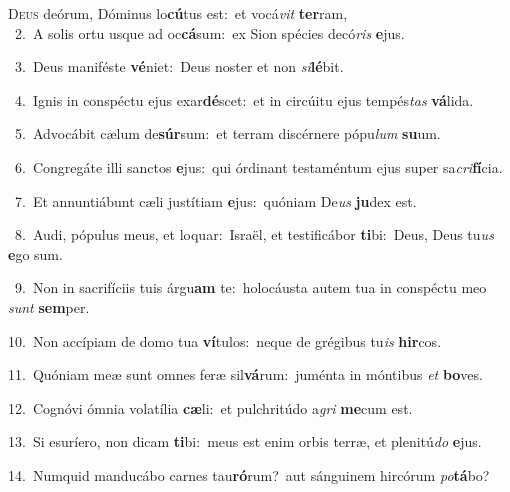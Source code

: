 \lettrine{\initial\textcolor{\initialcolor}{D}}{eus} deórum, Dóminus lo\-\textbf{cú}\-tus est:~\star et vocá\textit{vit} \textbf{ter}\-ram,\\
{\numbfont\textcolor{\numbcolor}{~2.}}~A solis ortu usque ad oc\-\textbf{cá}\-sum:~\star ex Sion spécies decó\textit{ris} \textbf{e}\-jus.\par
{\numbfont\textcolor{\numbcolor}{~3.}}~Deus maniféste \textbf{vé}\-niet:~\star Deus noster et non \textit{si}\-\textbf{lé}bit.\par
{\numbfont\textcolor{\numbcolor}{~4.}}~Ignis in conspéctu ejus exar\-\textbf{dé}\-scet:~\star et in circúitu ejus tempés\textit{tas} \textbf{vá}\-lida.\par
{\numbfont\textcolor{\numbcolor}{~5.}}~Advocábit cælum de\-\textbf{súr}\-sum:~\star et terram discérnere pópu\textit{lum} \textbf{su}\-um.\par
{\numbfont\textcolor{\numbcolor}{~6.}}~Congregáte illi sanctos \textbf{e}\-jus:~\star qui órdinant testaméntum ejus super sa\-\textit{cri}\-\textbf{fí}cia.\par
{\numbfont\textcolor{\numbcolor}{~7.}}~Et annuntiábunt cæli justítiam \textbf{e}\-jus:~\star quóniam De\textit{us} \textbf{ju}\-dex est.\par
{\numbfont\textcolor{\numbcolor}{~8.}}~Audi, pópulus meus, et loquar:~\dagger Israël, et testificábor \textbf{ti}\-bi:~\star Deus, Deus tu\textit{us} \textbf{e}\-go sum.\par
{\numbfont\textcolor{\numbcolor}{~9.}}~Non in sacrifíciis tuis árgu\textbf{am} te:~\star holocáusta autem tua in conspéctu meo \textit{sunt} \textbf{sem}\-per.\par
{\numbfont\textcolor{\numbcolor}{10.}}~Non accípiam de domo tua \textbf{ví}\-tulos:~\star neque de grégibus tu\textit{is} \textbf{hir}\-cos.\par
{\numbfont\textcolor{\numbcolor}{11.}}~Quóniam meæ sunt omnes feræ sil\-\textbf{vá}\-rum:~\star juménta in móntibus \textit{et} \textbf{bo}\-ves.\par
{\numbfont\textcolor{\numbcolor}{12.}}~Cognóvi ómnia volatília \textbf{cæ}\-li:~\star et pulchritúdo a\textit{gri} \textbf{me}\-cum est.\par
{\numbfont\textcolor{\numbcolor}{13.}}~Si esuríero, non dicam \textbf{ti}\-bi:~\star meus est enim orbis terræ, et plenitú\textit{do} \textbf{e}\-jus.\par
{\numbfont\textcolor{\numbcolor}{14.}}~Numquid manducábo carnes tau\-\textbf{ró}\-rum?~\star aut sánguinem hircórum \textit{po}\-\textbf{tá}bo?\par
